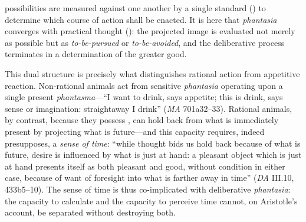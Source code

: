 \begin{itemize}
\begin{itemize}
\begin{itemize}
\begin{enumerate}
\begin{itemize}
                      possibilities are measured against one another by a single
                      standard () to determine which
                      course of action shall be enacted. It is here that
                      \textit{phantasia} converges with practical thought
                      (): the projected image is evaluated not
                      merely as possible but as \textit{to-be-pursued} or
                      \textit{to-be-avoided}, and the deliberative process terminates
                      in a determination of the greater good.
                  \end{itemize}
                  This dual structure is precisely what distinguishes rational action
                  from appetitive reaction. Non-rational animals act from sensitive
                  \textit{phantasia} operating upon a single present
                  \textit{phantasma}---``I want to drink, says appetite; this is
                  drink, says sense or imagination: straightaway I drink''
                  (\textit{MA} 701a32--33). Rational animals, by contrast, because
                  they possess , can hold back from what is
                  immediately present by projecting what is future---and this capacity
                  requires, indeed presupposes, a \textit{sense of time}: ``while
                  thought bids us hold back because of what is future, desire is
                  influenced by what is just at hand: a pleasant object which is just
                  at hand presents itself as both pleasant and good, without condition
                  in either case, because of want of foresight into what is farther
                  away in time'' (\textit{DA} III.10, 433b5--10). The sense of time is
                  thus co-implicated with deliberative \textit{phantasia}: the capacity
                  to calculate and the capacity to perceive time cannot, on Aristotle's
                  account, be separated without destroying both.


              \end{enumerate}


\end{itemize}
\end{itemize}
\end{itemize}
